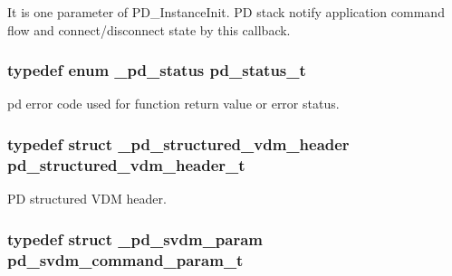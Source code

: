 It is one parameter of P\-D\-\_\-\-Instance\-Init. P\-D stack notify application command flow and connect/disconnect state by this callback. \hypertarget{group__usb__pd__stack_ga04a1f331d9807a70ab9bb753f5ed1c80}{
\subsubsection[{pd\-\_\-status\-\_\-t}]{\setlength{\rightskip}{0pt plus 5cm}typedef enum {\bf \-\_\-pd\-\_\-status}  {\bf pd\-\_\-status\-\_\-t}}}\label{group__usb__pd__stack_ga04a1f331d9807a70ab9bb753f5ed1c80}


pd error code used for function return value or error status. 

\hypertarget{group__usb__pd__stack_ga245b8bec3f3b7771e73016ac98595570}{
\subsubsection[{pd\-\_\-structured\-\_\-vdm\-\_\-header\-\_\-t}]{\setlength{\rightskip}{0pt plus 5cm}typedef struct {\bf \-\_\-pd\-\_\-structured\-\_\-vdm\-\_\-header}  {\bf pd\-\_\-structured\-\_\-vdm\-\_\-header\-\_\-t}}}\label{group__usb__pd__stack_ga245b8bec3f3b7771e73016ac98595570}


P\-D structured V\-D\-M header. 

\hypertarget{group__usb__pd__stack_gacedc4a601815782eff03211731ea2c7a}{
\subsubsection[{pd\-\_\-svdm\-\_\-command\-\_\-param\-\_\-t}]{\setlength{\rightskip}{0pt plus 5cm}typedef struct {\bf \-\_\-pd\-\_\-svdm\-\_\-param}  {\bf pd\-\_\-svdm\-\_\-command\-\_\-param\-\_\-t}}}\label{group__usb__pd__stack_gacedc4a601815782eff03211731ea2c7a}


